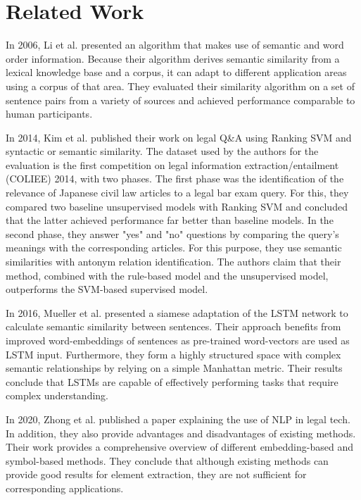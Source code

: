 \documentclass[runningheads]{llncs}
\begin{document}
\section{Related Work}
\label{sec:related_work}

In 2006, Li et al.\cite{li2006sentence} presented an algorithm that makes use of semantic and word order information. Because their algorithm derives semantic similarity from a lexical knowledge base and a corpus, it can adapt to different application areas using a corpus of that area. They evaluated their similarity algorithm on a set of sentence pairs from a variety of sources and achieved performance comparable to human participants.

In 2014, Kim et al.\cite{kim2014legal} published their work on legal Q\&A using Ranking SVM and syntactic or semantic similarity. The dataset used by the authors for the evaluation is the first competition on legal information extraction/entailment (COLIEE) 2014, with two phases. The first phase was the identification of the relevance of Japanese civil law articles to a legal bar exam query. For this, they compared two baseline unsupervised models with Ranking SVM and concluded that the latter achieved performance far better than baseline models. In the second phase, they answer "yes" and "no" questions by comparing the query's meanings with the corresponding articles. For this purpose, they use semantic similarities with antonym relation identification. The authors claim that their method, combined with the rule-based model and the unsupervised model, outperforms the SVM-based supervised model. 

In 2016, Mueller et al.\cite{Mueller_Thyagarajan_2016} presented a siamese adaptation of the LSTM network to calculate semantic similarity between sentences. Their approach benefits from improved word-embeddings of sentences as pre-trained word-vectors are used as LSTM input. Furthermore, they form a highly structured space with complex semantic relationships by relying on a simple Manhattan metric\cite{garner1963iterative}. Their results conclude that LSTMs are capable of effectively performing tasks that require complex understanding.

In 2020, Zhong et al.\cite{zhong2020does} published a paper explaining the use of NLP in legal tech. In addition, they also provide advantages and disadvantages of existing methods. Their work provides a comprehensive overview of different embedding-based and symbol-based methods. They conclude that although existing methods can provide good results for element extraction, they are not sufficient for corresponding applications. 
\end{document}
